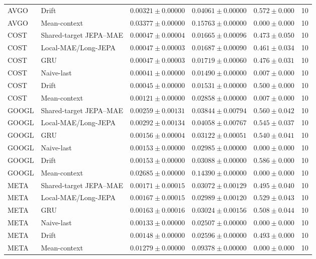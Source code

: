 \begin{longtable}{llrrrr}
AVGO & Drift & $0.00321 \pm 0.00000$ & $0.04061 \pm 0.00000$ & $0.572 \pm 0.000$ & 10 \\
AVGO & Mean-context & $0.03377 \pm 0.00000$ & $0.15763 \pm 0.00000$ & $0.000 \pm 0.000$ & 10 \\
COST & Shared-target JEPA--MAE & $0.00047 \pm 0.00004$ & $0.01665 \pm 0.00096$ & $0.473 \pm 0.050$ & 10 \\
COST & Local-MAE/Long-JEPA & $0.00047 \pm 0.00003$ & $0.01687 \pm 0.00090$ & $0.461 \pm 0.034$ & 10 \\
COST & GRU & $0.00047 \pm 0.00003$ & $0.01719 \pm 0.00060$ & $0.476 \pm 0.031$ & 10 \\
COST & Naive-last & $0.00041 \pm 0.00000$ & $0.01490 \pm 0.00000$ & $0.007 \pm 0.000$ & 10 \\
COST & Drift & $0.00045 \pm 0.00000$ & $0.01531 \pm 0.00000$ & $0.500 \pm 0.000$ & 10 \\
COST & Mean-context & $0.00121 \pm 0.00000$ & $0.02858 \pm 0.00000$ & $0.007 \pm 0.000$ & 10 \\
GOOGL & Shared-target JEPA--MAE & $0.00259 \pm 0.00131$ & $0.03844 \pm 0.00794$ & $0.560 \pm 0.042$ & 10 \\
GOOGL & Local-MAE/Long-JEPA & $0.00292 \pm 0.00134$ & $0.04058 \pm 0.00767$ & $0.545 \pm 0.037$ & 10 \\
GOOGL & GRU & $0.00156 \pm 0.00004$ & $0.03122 \pm 0.00051$ & $0.540 \pm 0.041$ & 10 \\
GOOGL & Naive-last & $0.00153 \pm 0.00000$ & $0.02985 \pm 0.00000$ & $0.000 \pm 0.000$ & 10 \\
GOOGL & Drift & $0.00153 \pm 0.00000$ & $0.03088 \pm 0.00000$ & $0.586 \pm 0.000$ & 10 \\
GOOGL & Mean-context & $0.02685 \pm 0.00000$ & $0.14390 \pm 0.00000$ & $0.000 \pm 0.000$ & 10 \\
META & Shared-target JEPA--MAE & $0.00171 \pm 0.00015$ & $0.03072 \pm 0.00129$ & $0.495 \pm 0.040$ & 10 \\
META & Local-MAE/Long-JEPA & $0.00167 \pm 0.00015$ & $0.02989 \pm 0.00120$ & $0.529 \pm 0.043$ & 10 \\
META & GRU & $0.00163 \pm 0.00016$ & $0.03024 \pm 0.00156$ & $0.508 \pm 0.044$ & 10 \\
META & Naive-last & $0.00133 \pm 0.00000$ & $0.02507 \pm 0.00000$ & $0.000 \pm 0.000$ & 10 \\
META & Drift & $0.00148 \pm 0.00000$ & $0.02596 \pm 0.00000$ & $0.493 \pm 0.000$ & 10 \\
META & Mean-context & $0.01279 \pm 0.00000$ & $0.09378 \pm 0.00000$ & $0.000 \pm 0.000$ & 10 \\

\end{longtable}
